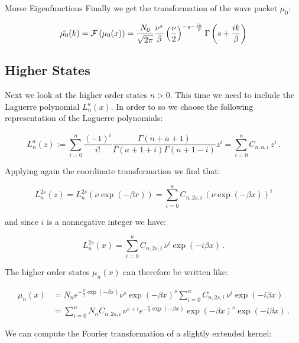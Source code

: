 \begin{chapter}{Morse Eigenfunctions}
Finally we get the transformation of the wave packet $\mu_{0}$:

\begin{equation*}
  \hat{\mu_{0}}(k) = \mathcal{F}\left(\mu_{0}(x)\right) =
  \frac{N_{0}}{\sqrt{2\pi}}
  \frac{\nu^{s}}{\beta}
  \left(\frac{\nu}{2}\right)^{-s -\frac{i k}{\beta}}
  \Gamma \left(s+\frac{i k}{\beta}\right)
\end{equation*}

\subsection{Higher States}

Next we look at the higher order states $n>0$. This time we need to include
the Laguerre polynomial $L_{n}^{a}(x)$. In order to so we choose the following representation of the Laguerre polynomials:

\begin{equation}
  L_{n}^{a}(z) := \sum_{i=0}^{n} \frac{(-1)^{i}}{i!}
                                \frac{\Gamma(n+a+1)}{\Gamma(a+1+i) \Gamma(n+1-i)}
                                z^{i}
                = \sum_{i=0}^{n} C_{n,a,i} \, z^{i} \,.
\end{equation}

Applying again the coordinate transformation we find that:

\begin{equation}
  L_{n}^{2s}(z)
  = L_{n}^{2s}\left(\nu \exp(-\beta x)\right)
  = \sum_{i=0}^{n} C_{n,2s,i} \, \left(\nu \exp(-\beta x)\right)^{i}
\end{equation}

and since $i$ is a nonnegative integer we have:

\begin{equation}
  L_{n}^{2s}(x) = \sum_{i=0}^{n} C_{n,2s,i} \, \nu^{i} \exp(- i \beta x) \,.
\end{equation}

The higher order states $\mu_{n}(x)$ can therefore be written like:

\begin{align}
  \mu_{n}(x)
  & = N_{n} e^{-\frac{\nu}{2} \exp(-\beta x)} \nu^{s} \exp(-\beta x)^{s} \sum_{i=0}^{n} C_{n,2s,i} \, \nu^{i} \exp(- i \beta x) \\
  & = \sum_{i=0}^{n} N_{n} C_{n,2s,i} \, \nu^{s+i} e^{-\frac{\nu}{2} \exp(-\beta x)} \exp(-\beta x)^{s} \exp(- i \beta x) \,.
\end{align}

We can compute the Fourier transformation of a slightly extended kernel:


\end{chapter}
